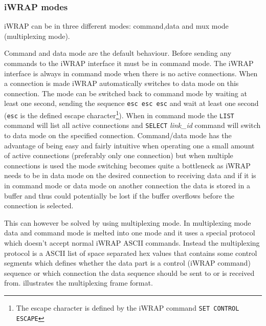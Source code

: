 \documentclass[a4paper, oneside, final]{memoir}
\let\Fref\undefined
\begin{document}
\subsubsection{iWRAP modes}

iWRAP can be in three different modes: command,data and mux mode (multiplexing
mode).

Command and data mode are the default behaviour. Before sending any commands to
the iWRAP interface it must be in command mode. The iWRAP interface is always in
command mode when there is no active connections. When a connection is made
iWRAP automatically switches to data mode on this connection.  The mode can be
switched back to command mode by waiting at least one second, sending the
sequence \texttt{esc esc esc} and wait at least one second (\texttt{esc} is the
defined escape character\footnote{The escape character is defined by the iWRAP
  command \texttt{SET CONTROL ESCAPE}}). When in command mode the \texttt{LIST}
command will list all active connections and \texttt{SELECT} \textit{link\_id}
command will switch to data mode on the specified connection. Command/data mode
has the advantage of being easy and fairly intuitive when operating one a small
amount of active connections (preferably only one connection) but when multiple
connections is used the mode switching becomes quite a bottleneck as iWRAP needs
to be in data mode on the desired connection to receiving data and if it is in
command mode or data mode on another connection the data is stored in a buffer
and thus could potentially be lost if the buffer overflows before the connection
is selected.

This can however be solved by using multiplexing mode. In multiplexing mode data
and command mode is melted into one mode and it uses a special protocol which
doesn't accept normal iWRAP ASCII commands. Instead the multiplexing protocol is
a ASCII list of space separated hex values that contains some control segments
which defines whether the data part is a control (iWRAP command) sequence or
which connection the data sequence should be sent to or is received
from. \Fref{tab:multiplexing_protocol} illustrates the multiplexing frame
format.
\end{document}
